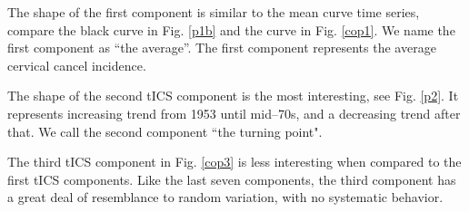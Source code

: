\documentclass{llncs}
\begin{document}
\begin{figure}
     \centering
     \caption{}
     \label{tcomp}
\end{figure}

 
The shape of the first component is similar to the mean curve time series, compare the black curve  in Fig. \ref{p1b} and the curve in Fig. \ref{cop1}. We name the first component as  ``the average''. The first component represents the average cervical cancel incidence.

The shape of the second tICS component is the most interesting, see Fig. \ref{p2}. It represents increasing trend from 1953 until mid--70s, and a decreasing trend after that. We call the second component ``the turning point". 

The third tICS component in Fig. \ref{cop3} is less interesting when compared to the first  tICS components. Like the last seven components, the third component  has a great deal of resemblance to random variation, with no systematic behavior.
\end{document}
